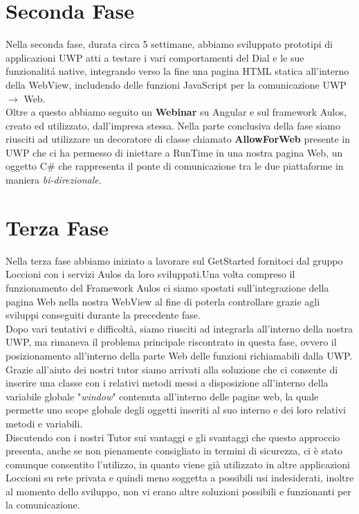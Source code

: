 \section{Seconda Fase}

Nella seconda fase, durata circa 5 settimane, abbiamo sviluppato prototipi di applicazioni UWP atti a testare i vari comportamenti del Dial e le sue funzionalitá native, integrando verso la fine una pagina HTML statica all'interno della WebView, includendo delle funzioni JavaScript per la comunicazione UWP $\rightarrow$ Web.\\

Oltre a questo abbiamo seguito un \textbf{Webinar} su Angular e sul framework Aulos, creato ed utilizzato, dall'impresa stessa.
Nella parte conclusiva della fase siamo riusciti ad utilizzare un decoratore di classe chiamato \textbf{AllowForWeb} presente in UWP che ci ha permesso di iniettare a RunTime in una nostra pagina Web, un oggetto C\# che rappresenta il ponte di comunicazione tra le due piattaforme in maniera \emph{bi-direzionale}.


\section{Terza Fase}

Nella terza fase abbiamo iniziato a lavorare sul GetStarted fornitoci dal gruppo Loccioni con i servizi Aulos da loro sviluppati.Una volta compreso il funzionamento del Framework Aulos ci siamo spostati sull'integrazione della pagina Web nella nostra WebView al fine di poterla controllare grazie agli sviluppi conseguiti durante la precedente fase.\\

Dopo vari tentativi e difficoltà, siamo riusciti ad integrarla all'interno della nostra UWP, ma rimaneva il problema principale riscontrato in questa fase, ovvero il posizionamento all'interno della parte Web delle funzioni richiamabili dalla UWP.
Grazie all'aiuto dei nostri tutor siamo arrivati alla soluzione che ci consente di inserire una classe con i relativi metodi messi a disposizione all'interno della variabile globale "\emph{window}" contenuta all'interno delle pagine web, la quale permette uno scope globale degli oggetti inseriti al suo interno e dei loro relativi metodi e variabili.\\

Discutendo con i nostri Tutor sui vantaggi e gli svantaggi che questo approccio presenta, anche se non pienamente consigliato in termini di sicurezza, ci è stato comunque consentito l'utilizzo, in quanto viene già utilizzato in altre applicazioni Loccioni su rete privata e quindi meno soggetta a possibili usi indesiderati, inoltre al momento dello sviluppo, non vi erano altre soluzioni possibili e funzionanti per la comunicazione.\\

